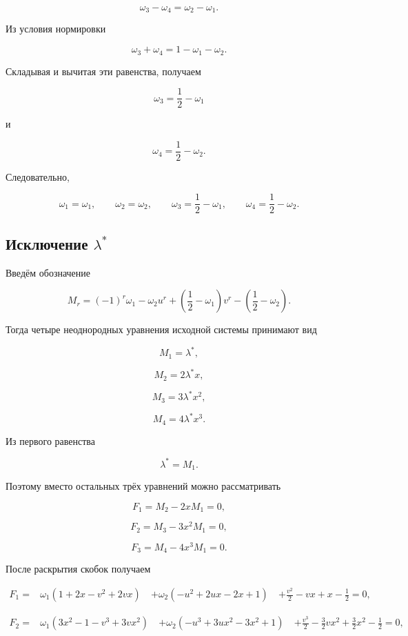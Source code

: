 \documentclass[12pt,a4paper]{article}
\begin{document}
	$$
	\omega_3-\omega_4=\omega_2-\omega_1.
	$$
	
	Из условия нормировки
	
	$$
	\omega_3+\omega_4=1-\omega_1-\omega_2.
	$$
	
	Складывая и вычитая эти равенства, получаем
	
	$$
	\boxed{
		\omega_3=\frac12-\omega_1
	}
	$$
	
	и
	
	$$
	\boxed{
		\omega_4=\frac12-\omega_2.
	}
	$$
	
	Следовательно,
	
	$$
	\omega_1=\omega_1,\qquad
	\omega_2=\omega_2,\qquad
	\omega_3=\frac12-\omega_1,\qquad
	\omega_4=\frac12-\omega_2.
	$$
	
	\subsection{Исключение $\lambda^*$}
	
	Введём обозначение
	
	$$
	M_r=
	(-1)^r\omega_1
	-\omega_2u^r
	+\left(\frac12-\omega_1\right)v^r
	-\left(\frac12-\omega_2\right).
	$$
	
	Тогда четыре неоднородных уравнения исходной системы принимают вид
	
	$$
	M_1=\lambda^*,
	$$
	
	$$
	M_2=2\lambda^*x,
	$$
	
	$$
	M_3=3\lambda^*x^2,
	$$
	
	$$
	M_4=4\lambda^*x^3.
	$$
	
	Из первого равенства
	
	$$
	\lambda^*=M_1.
	$$
	
	Поэтому вместо остальных трёх уравнений можно рассматривать
	
	$$
	\boxed{
		F_1=M_2-2xM_1=0,
	}
	$$
	
	$$
	\boxed{
		F_2=M_3-3x^2M_1=0,
	}
	$$
	
	$$
	\boxed{
		F_3=M_4-4x^3M_1=0.
	}
	$$
	
	После раскрытия скобок получаем
	
	$$
	\boxed{
		\begin{aligned}
			F_1={}&
			\omega_1(1+2x-v^2+2vx)
			\
			&+\omega_2(-u^2+2ux-2x+1)
			\
			&+\frac{v^2}{2}-vx+x-\frac12
			=0,
		\end{aligned}
	}
	$$
	
	$$
	\boxed{
		\begin{aligned}
			F_2={}&
			\omega_1(3x^2-1-v^3+3vx^2)
			\
			&+\omega_2(-u^3+3ux^2-3x^2+1)
			\
			&+\frac{v^3}{2}
			-\frac32vx^2
			+\frac32x^2-\frac12
			=0,
		\end{aligned}
	}
	$$
	
\end{document}
